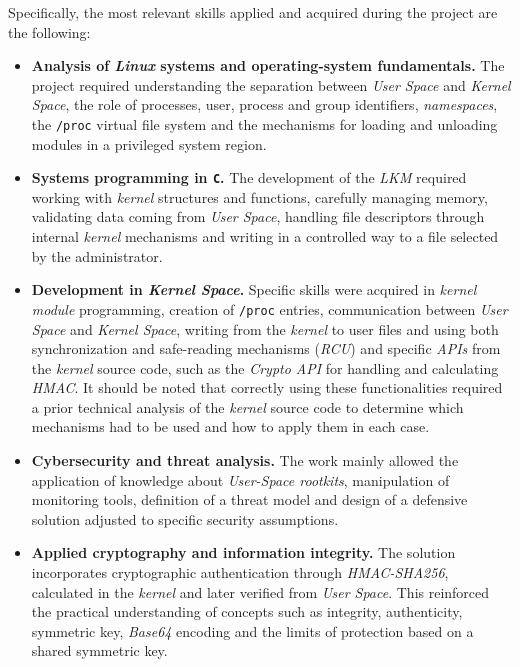 Specifically, the most relevant skills applied and acquired during the project are the following:

\begin{itemize}
    \item \textbf{Analysis of \textit{Linux} systems and operating-system fundamentals.} The project required understanding the separation between \textit{User Space} and \textit{Kernel Space}, the role of processes, user, process and group identifiers, \textit{namespaces}, the \texttt{/proc} virtual file system and the mechanisms for loading and unloading modules in a privileged system region.
    
    \item \textbf{Systems programming in \texttt{C}.} The development of the \textit{LKM} required working with \textit{kernel} structures and functions, carefully managing memory, validating data coming from \textit{User Space}, handling file descriptors through internal \textit{kernel} mechanisms and writing in a controlled way to a file selected by the administrator.
    
    \item \textbf{Development in \textit{Kernel Space}.} Specific skills were acquired in \textit{kernel module} programming, creation of \texttt{/proc} entries, communication between \textit{User Space} and \textit{Kernel Space}, writing from the \textit{kernel} to user files and using both synchronization and safe-reading mechanisms (\textit{RCU}) and specific \textit{APIs} from the \textit{kernel} source code, such as the \textit{Crypto API} for handling and calculating \textit{HMAC}.
    It should be noted that correctly using these functionalities required a prior technical analysis of the \textit{kernel} source code to determine which mechanisms had to be used and how to apply them in each case.
    
    \item \textbf{Cybersecurity and threat analysis.} The work mainly allowed the application of knowledge about \textit{User-Space rootkits}, manipulation of monitoring tools, definition of a threat model and design of a defensive solution adjusted to specific security assumptions.
    
    \item \textbf{Applied cryptography and information integrity.} The solution incorporates cryptographic authentication through \textit{HMAC-SHA256}, calculated in the \textit{kernel} and later verified from \textit{User Space}. This reinforced the practical understanding of concepts such as integrity, authenticity, symmetric key, \textit{Base64} encoding and the limits of protection based on a shared symmetric key.
    

\end{itemize}
